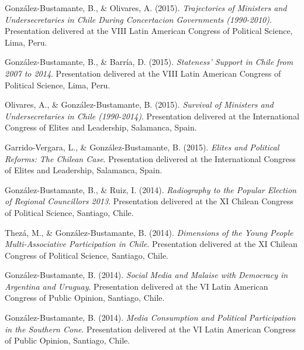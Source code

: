 \begin{publications}
\begin{benumerate}{66}
\item{\small González-Bustamante, B., \& Olivares, A. (2015). {\itshape Trajectories of Ministers and Undersecretaries in Chile During Concertacion Governments (1990-2010)}. Presentation delivered at the VIII Latin American Congress of Political Science, Lima, Peru.}\vspace{1mm}

\item{\small González-Bustamante, B., \& Barría, D. (2015). {\itshape Stateness' Support in Chile from 2007 to 2014}. Presentation delivered at the VIII Latin American Congress of Political Science, Lima, Peru.}\vspace{1mm}

\item{\small Olivares, A., \& González-Bustamante, B. (2015). {\itshape Survival of Ministers and Undersecretaries in Chile (1990-2014)}. Presentation delivered at the International Congress of Elites and Leadership, Salamanca, Spain.}\vspace{1mm}

\item{\small Garrido-Vergara, L., \& González-Bustamante, B. (2015). {\itshape Elites and Political Reforms: The Chilean Case}. Presentation delivered at the International Congress of Elites and Leadership, Salamanca, Spain.}\vspace{1mm}

\item{\small González-Bustamante, B., \& Ruiz, I. (2014). {\itshape Radiography to the Popular Election of Regional Councillors 2013}. Presentation delivered at the XI Chilean Congress of Political Science, Santiago, Chile.}\vspace{1mm}

\item{\small Thezá, M., \& González-Bustamante, B. (2014). {\itshape Dimensions of the Young People Multi-Associative Participation in Chile}. Presentation delivered at the XI Chilean Congress of Political Science, Santiago, Chile.}\vspace{1mm}

\item{\small González-Bustamante, B. (2014). {\itshape Social Media and Malaise with Democracy in Argentina and Uruguay}. Presentation delivered at the VI Latin American Congress of Public Opinion, Santiago, Chile.}\vspace{1mm}

\item{\small González-Bustamante, B. (2014). {\itshape Media Consumption and Political Participation in the Southern Cone}. Presentation delivered at the VI Latin American Congress of Public Opinion, Santiago, Chile.}\vspace{1mm}


\end{benumerate}
\end{publications}
